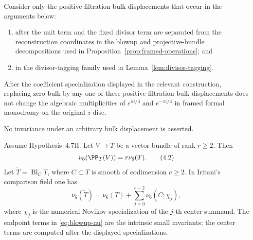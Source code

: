 \begin{hypothesisH}
Consider only the positive-filtration bulk displacements that occur in the
arguments below:
\begin{enumerate}[label=(\arabic*)]
\item after the unit term and the fixed divisor term are separated from the
  reconstruction coordinates in the blowup and projective-bundle
  decompositions used in Proposition~\ref{prop:framed-operations}; and
\item in the divisor-tagging family used in
  Lemma~\ref{lem:divisor-tagging}.
\end{enumerate}
After the coefficient specialization displayed in the relevant construction,
replacing zero bulk by any one of these positive-filtration bulk displacements
does not change the algebraic multiplicities of \(e^{\pi i/3}\) and
\(e^{-\pi i/3}\) in framed formal monodromy on the original \(z\)-disc.

No invariance under an arbitrary bulk displacement is asserted.
\end{hypothesisH}

\begin{proposition}
\label{prop:framed-operations}
Assume Hypothesis~4.7H.
Let \(V\to T\) be a vector bundle of rank \(r\ge2\).  Then
\[
 \nu_6(\PP_T(V))=r\nu_6(T).
 \tag{4.2}
 \label{eq:projective-bundle-nu}
\]
Let \(\widetilde T=\operatorname{Bl}_C T\), where \(C\subset T\) is smooth of
codimension \(c\ge2\).  In Iritani's comparison field one has
\[
 \nu_6(\widetilde T)=\nu_6(T)+
 \sum_{j=0}^{c-2}\nu_6(C;\chi_j),
 \tag{4.3}
 \label{eq:blowup-nu}
\]
where \(\chi_j\) is the numerical Novikov specialization of the \(j\)-th
center summand.  The endpoint terms in \eqref{eq:blowup-nu} are the intrinsic small
invariants; the center terms are computed after the displayed specializations.
\end{proposition}

